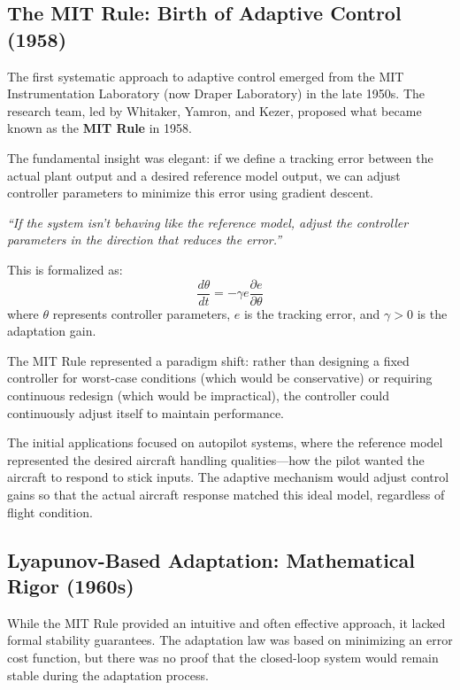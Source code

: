 \subsection{The MIT Rule: Birth of Adaptive Control (1958)}

The first systematic approach to adaptive control emerged from the MIT Instrumentation Laboratory (now Draper Laboratory) in the late 1950s. The research team, led by Whitaker, Yamron, and Kezer, proposed what became known as the \textbf{MIT Rule} in 1958.

The fundamental insight was elegant: if we define a tracking error between the actual plant output and a desired reference model output, we can adjust controller parameters to minimize this error using gradient descent.

\begin{keyconceptbox}[title=The MIT Rule Philosophy, sharp corners]
\textit{``If the system isn't behaving like the reference model, adjust the controller parameters in the direction that reduces the error.''}

This is formalized as:
\begin{equation}
\frac{d\theta}{dt} = -\gamma e \frac{\partial e}{\partial \theta}
\label{eq:mit_rule_intro}
\end{equation}
where $\theta$ represents controller parameters, $e$ is the tracking error, and $\gamma > 0$ is the adaptation gain.
\end{keyconceptbox}

The MIT Rule represented a paradigm shift: rather than designing a fixed controller for worst-case conditions (which would be conservative) or requiring continuous redesign (which would be impractical), the controller could continuously adjust itself to maintain performance.

The initial applications focused on autopilot systems, where the reference model represented the desired aircraft handling qualities---how the pilot wanted the aircraft to respond to stick inputs. The adaptive mechanism would adjust control gains so that the actual aircraft response matched this ideal model, regardless of flight condition.

\subsection{Lyapunov-Based Adaptation: Mathematical Rigor (1960s)}

While the MIT Rule provided an intuitive and often effective approach, it lacked formal stability guarantees. The adaptation law was based on minimizing an error cost function, but there was no proof that the closed-loop system would remain stable during the adaptation process.

